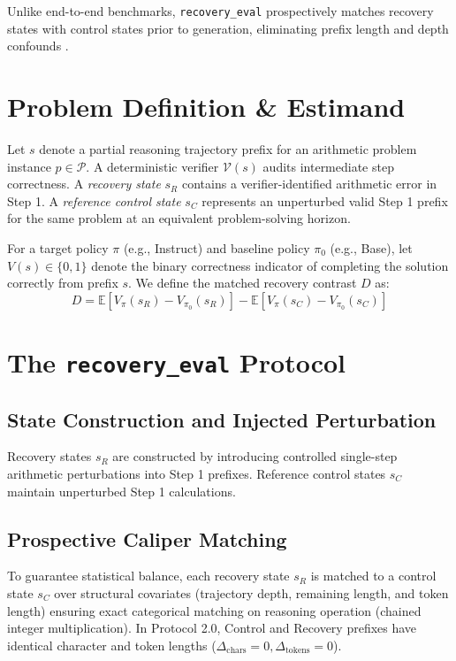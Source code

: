 \documentclass[10pt,conference]{IEEEtran}
\begin{document}
Unlike end-to-end benchmarks, \texttt{recovery\_eval} prospectively matches recovery states with control states prior to generation, eliminating prefix length and depth confounds \cite{rosenbaum1983central, ho2007matching, austin2011introduction}.

\section{Problem Definition \& Estimand}
Let $s$ denote a partial reasoning trajectory prefix for an arithmetic problem instance $p \in \mathcal{P}$. A deterministic verifier $\mathcal{V}(s)$ audits intermediate step correctness. A \textit{recovery state} $s_R$ contains a verifier-identified arithmetic error in Step 1. A \textit{reference control state} $s_C$ represents an unperturbed valid Step 1 prefix for the same problem at an equivalent problem-solving horizon.

For a target policy $\pi$ (e.g., Instruct) and baseline policy $\pi_0$ (e.g., Base), let $V(s) \in \{0, 1\}$ denote the binary correctness indicator of completing the solution correctly from prefix $s$. We define the matched recovery contrast $D$ as:
\begin{equation}
D = \mathbb{E}[V_{\pi}(s_R) - V_{\pi_0}(s_R)] - \mathbb{E}[V_{\pi}(s_C) - V_{\pi_0}(s_C)]
\end{equation}

\section{The \texttt{recovery\_eval} Protocol}

\subsection{State Construction and Injected Perturbation}
Recovery states $s_R$ are constructed by introducing controlled single-step arithmetic perturbations into Step 1 prefixes. Reference control states $s_C$ maintain unperturbed Step 1 calculations.

\subsection{Prospective Caliper Matching}
To guarantee statistical balance, each recovery state $s_R$ is matched to a control state $s_C$ over structural covariates (trajectory depth, remaining length, and token length) ensuring exact categorical matching on reasoning operation (chained integer multiplication). In Protocol 2.0, Control and Recovery prefixes have identical character and token lengths ($\Delta_{\text{chars}} = 0, \Delta_{\text{tokens}} = 0$).
\end{document}
